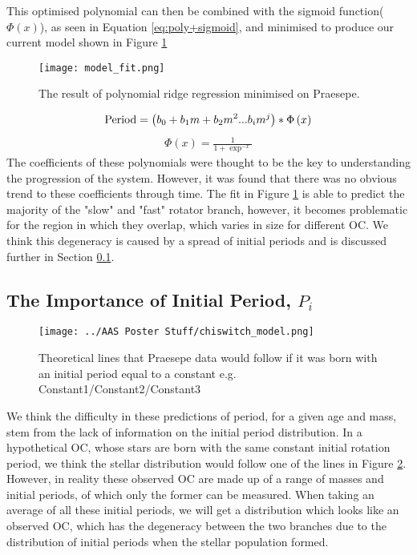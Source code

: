 \documentclass[fleqn,usenatbib]{mnras}
\begin{document}
{This optimised polynomial can then be combined with the sigmoid function($\Phi\left(x\right)$), as seen in Equation \ref{eq:poly+sigmoid}, and minimised to produce our current model shown in Figure \ref{fig:model_fit}
\begin{figure}
	\texttt{[image: model\_fit.png]}
	\caption{The result of polynomial ridge regression minimised on Praesepe.}
	\label{fig:model_fit}
\end{figure}
\begin{align}
	\label{eq:poly+sigmoid}
	\textup{Period} = \left(b_0 + b_1m + b_2m^2...b_im^j\right)*\Phi\left(x\right) 
\end{align}
\begin{align}
	\label{eq:sigmoid}
	\Phi\left(x\right) = \frac{1}{1 + \exp^{-x}}
\end{align}
The coefficients of these polynomials were thought to be the key to understanding the progression of the system.
However, it was found that there was no obvious trend to these coefficients through time.
The fit in Figure \ref{fig:model_fit} is able to predict the majority of the "slow" and "fast" rotator branch, however, it becomes problematic for the region in which they overlap, which varies in size for different OC.
We think this degeneracy is caused by a spread of initial periods and is discussed further in Section \ref{sec:initial_period}.

\subsection{The Importance of Initial Period, $P_i$} \label{sec:initial_period}
\begin{figure}
	\texttt{[image: ../AAS Poster Stuff/chiswitch\_model.png]}
	\caption{Theoretical lines that Praesepe data would follow if it was born with an initial period equal to a constant e.g. Constant1/Constant2/Constant3}
	\label{fig:spread_initial_period}
\end{figure}
We think the difficulty in these predictions of period, for a given age and mass, stem from the lack of information on the initial period distribution.
In a hypothetical OC, whose stars are born with the same constant initial rotation period, we think the stellar distribution would follow one of the lines in Figure \ref{fig:spread_initial_period}.
However, in reality these observed OC are made up of a range of masses and initial periods, of which only the former can be measured.
When taking an average of all these initial periods, we will get a distribution which looks like an observed OC, which has the degeneracy between the two branches due to the distribution of initial periods when the stellar population formed.

}
\end{document}
